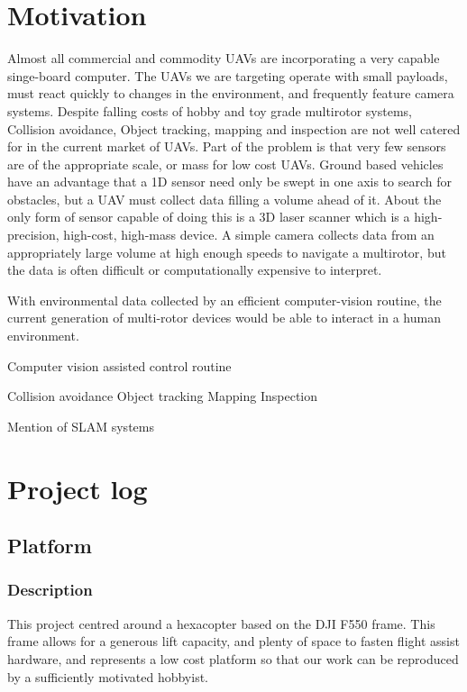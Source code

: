 \documentclass[a4paper, 11pt, titlepage]{article}
\begin{document}
\section{Motivation}
	Almost all commercial and commodity UAVs are incorporating a very capable singe-board computer.
	The UAVs we are targeting operate with small payloads, must react quickly to changes in the environment, and frequently feature camera systems.
	Despite falling costs of hobby and toy grade multirotor systems, Collision avoidance, Object tracking, 	mapping and inspection are not well catered for in the current market of UAVs.
	Part of the problem is that very few sensors are of the appropriate scale, or mass for low cost UAVs.
	Ground based vehicles have an advantage that a 1D sensor need only be swept in one axis to search for obstacles, but a UAV must collect data filling a volume ahead of it. About the only form of sensor capable of doing this is a 3D laser scanner which is a high-precision, high-cost, high-mass device.
	A simple camera collects data from an appropriately large volume at high enough speeds to navigate a multirotor, but the data is often difficult or computationally expensive to interpret.

	With environmental data collected by an efficient computer-vision routine, the current generation of multi-rotor devices would be able to interact in a human environment.

	Computer vision assisted control routine

	Collision avoidance
	Object tracking
	Mapping
	Inspection
	
	Mention of SLAM systems


\section{Project log}

	\subsection{Platform}
		\subsubsection{Description}
			This project centred around a hexacopter based on the DJI F550 frame. This frame allows for a generous lift capacity, and plenty of space to fasten flight assist hardware, and represents a low cost platform so that our work can be reproduced by a sufficiently motivated hobbyist.
			
\end{document}
